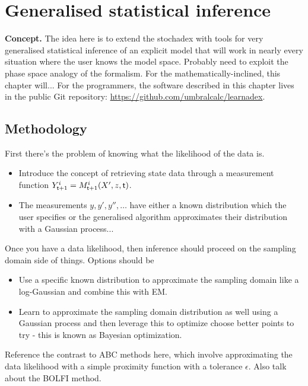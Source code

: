 \chapter{\sffamily Generalised statistical inference}

{\bfseries\sffamily Concept.} The idea here is to extend the stochadex with tools for very generalised statistical inference of an explicit model that will work in nearly every situation where the user knows the model space. Probably need to exploit the phase space analogy of the formalism. For the mathematically-inclined, this chapter will... For the programmers, the software described in this chapter lives in the public Git repository: \href{https://github.com/umbralcalc/learnadex}{https://github.com/umbralcalc/learnadex}.


\section{\sffamily Methodology}

First there's the problem of knowing what the likelihood of the data is.
\begin{itemize}
\item{Introduce the concept of retrieving state data through a measurement function $Y^i_{{\sf t}+1} = M^i_{{\sf t}+1}(X',z,{\sf t})$.}
\item{The measurements $y, y', y'', \dots$ have either a known distribution which the user specifies or the generalised algorithm approximates their distribution with a Gaussian process...}
\end{itemize}
Once you have a data likelihood, then inference should proceed on the sampling domain side of things. Options should be
\begin{itemize}
\item{Use a specific known distribution to approximate the sampling domain like a log-Gaussian and combine this with EM.}
\item{Learn to approximate the sampling domain distribution as well using a Gaussian process and then leverage this to optimize choose better points to try - this is known as Bayesian optimization.} 
\end{itemize}

Reference the contrast to ABC methods here, which involve approximating the data likelihood with a simple proximity function with a tolerance $\epsilon$. Also talk about the BOLFI method.